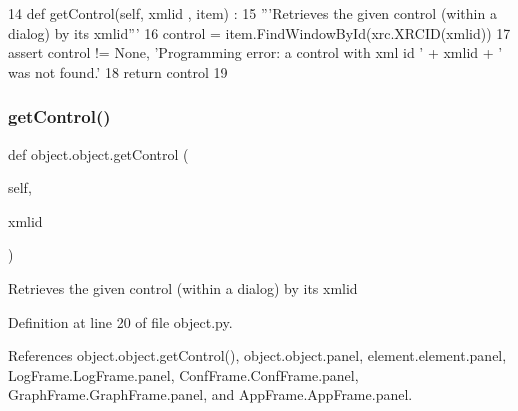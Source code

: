 \begin{DoxyCode}
14     \textcolor{keyword}{def }getControl(self, xmlid , item) :
15         \textcolor{stringliteral}{'''Retrieves the given control (within a dialog) by its xmlid'''}
16         control = item.FindWindowById(xrc.XRCID(xmlid))
17         \textcolor{keyword}{assert} control != \textcolor{keywordtype}{None}, \textcolor{stringliteral}{'Programming error: a control with xml id '} + xmlid + \textcolor{stringliteral}{' was not found.'}
18         \textcolor{keywordflow}{return} control
19 
\end{DoxyCode}
\mbox{\label{classobject_1_1object_a22a9d1ff67cd6e990cf1b63ed49c50e4}} 
\subsubsection{\texorpdfstring{get\+Control()}{getControl()}\hspace{0.1cm}{\footnotesize\ttfamily [2/2]}}
{\footnotesize\ttfamily def object.\+object.\+get\+Control (\begin{DoxyParamCaption}\item[{}]{self,  }\item[{}]{xmlid }\end{DoxyParamCaption})}

\begin{DoxyVerb}Retrieves the given control (within a dialog) by its xmlid\end{DoxyVerb}
 

Definition at line 20 of file object.\+py.



References object.\+object.\+get\+Control(), object.\+object.\+panel, element.\+element.\+panel, Log\+Frame.\+Log\+Frame.\+panel, Conf\+Frame.\+Conf\+Frame.\+panel, Graph\+Frame.\+Graph\+Frame.\+panel, and App\+Frame.\+App\+Frame.\+panel.



